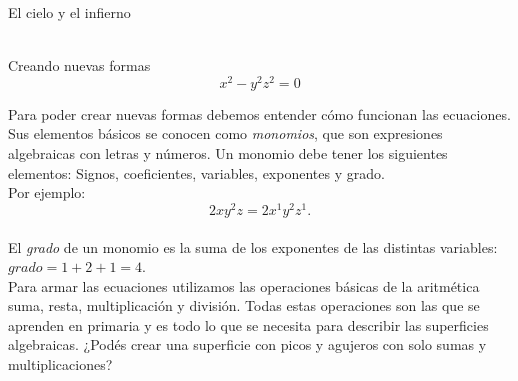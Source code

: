 \documentclass[es]{SurferDesc}%
\begin{document}
\footnotesize


\begin{surferPage}
  \begin{surferTitle}El cielo y el infierno\end{surferTitle}  \\
Creando nuevas formas \\
\smallskip
\[x^2	- y^2z^2	= 0\]

\singlespacing
Para poder crear nuevas formas debemos entender cómo funcionan las ecuaciones. Sus elementos básicos se conocen como  {\it monomios}, que son expresiones algebraicas con letras y números.
\singlespacing
Un monomio debe tener los siguientes elementos:
Signos, coeficientes, variables, exponentes y grado.\\
\singlespacing
Por ejemplo: 
\smallskip
\[2xy^2z = 2x^1y^2z^1.\]
\\
\smallskip
El  {\it grado} de un monomio es la suma de los exponentes de las distintas variables: $grado = 1+2+1=4$.  \\
\singlespacing
Para armar las ecuaciones utilizamos las operaciones básicas de la aritmética suma, resta, multiplicación y división. Todas estas operaciones son las que se aprenden en primaria y es todo lo que se necesita para describir las superficies algebraicas.
\singlespacing
¿Podés crear una superficie con picos y agujeros con solo sumas y multiplicaciones?


  \begin{surferText}
     \end{surferText}
\end{surferPage}
\end{document}
